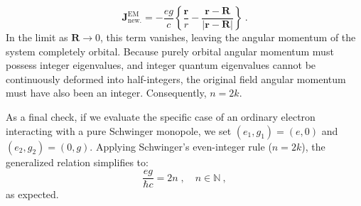 \documentclass[a4paper,11pt]{article}
\begin{document}
\begin{equation}
    \boldsymbol{J}_{\text{new.}}^{\text{EM}} = -\frac{eg}{c} \left\{ \frac{\boldsymbol{r}}{r} - \frac{\boldsymbol{r}-\boldsymbol{R}}{|\boldsymbol{r}-\boldsymbol{R}|} \right\}\ .
\end{equation}
In the limit as $\boldsymbol{R} \to 0$, this term vanishes, leaving the angular momentum of the system completely orbital. Because purely orbital angular momentum must possess integer eigenvalues, and integer quantum eigenvalues cannot be continuously deformed into half-integers, the original field angular momentum must have also been an integer. Consequently, $n = 2k$.

As a final check, if we evaluate the specific case of an ordinary electron interacting with a pure Schwinger monopole, we set $(e_1, g_1) = (e, 0)$ and $(e_2, g_2) = (0, g)$. Applying Schwinger's even-integer rule ($n = 2k$), the generalized relation simplifies to:
\begin{equation}
    \frac{eg}{\hbar c} = 2n \; , \quad n \in \mathbb{N}\ ,
\end{equation}
as expected.
\end{document}
